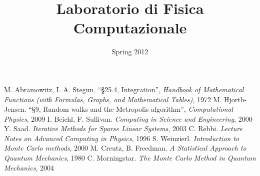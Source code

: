 \documentclass[a4paper,11pt]{report}
\title{\bfseries{\Huge{Laboratorio di Fisica Computazionale}}}
\author{\cursiveshape {Luca Cassia - [MAT. 728341]}}
\date{Spring 2012}
\begin{document}
\maketitle
\tableofcontents






\begin{thebibliography}{9}
 M. Abramowitz, I. A. Stegun. ``§25.4, Integration'', \textit{Handbook of Mathematical Functions (with Formulas, Graphs, and Mathematical Tables)}, 1972
 M. Hjorth-Jensen. ``§9, Random walks and the Metropolis algorithm'', \textit{Computational Physics}, 2009
 I. Beichl, F. Sullivan. \textit{Computing in Science and Engineering}, 2000
 Y. Saad. \textit{Iterative Methods for Sparse Linear Systems}, 2003
 C. Rebbi. \textit{Lecture Notes on Advanced Computing in Physics}, 1996
 S. Weinzierl. \textit{Introduction to Monte Carlo methods}, 2000
 M. Creutz, B. Freedman. \textit{A Statistical Approach to Quantum Mechanics}, 1980
 C. Morningstar. \textit{The Monte Carlo Method in Quantum Mechanics}, 2004
\end{thebibliography} 
\end{document}
